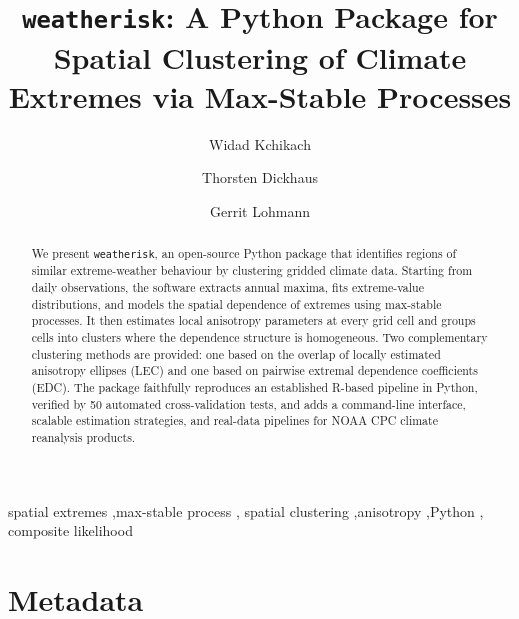 \documentclass[preprint,12pt,a4paper]{elsarticle}
\begin{document}
\begin{frontmatter}

\title{\texttt{weatherisk}: A Python Package for Spatial Clustering
  of Climate Extremes via Max-Stable Processes}

\author[awi,uni]{Widad Kchikach}

\author[uni]{Thorsten Dickhaus}
\author[awi,uni]{Gerrit Lohmann}

\address[awi]{Alfred Wegener Institute Helmholtz Centre for Polar
  and Marine Research, Bremerhaven, Germany}
\address[uni]{University of Bremen, Bremen, Germany}

\begin{abstract}
We present \texttt{weatherisk}, an open-source Python package that
identifies regions of similar extreme-weather behaviour by clustering
gridded climate data.  Starting from daily observations, the software
extracts annual maxima, fits extreme-value distributions, and models
the spatial dependence of extremes using max-stable processes.  It
then estimates local anisotropy parameters at every grid cell and
groups cells into clusters where the dependence structure is
homogeneous.  Two complementary clustering methods are provided:
one based on the overlap of locally estimated anisotropy ellipses
(LEC) and one based on pairwise extremal dependence coefficients
(EDC).  The package faithfully reproduces an established R-based
pipeline in Python, verified by 50 automated cross-validation tests,
and adds a command-line interface, scalable estimation strategies,
and real-data pipelines for NOAA CPC climate reanalysis products.
\end{abstract}

\begin{keyword}
spatial extremes \sep max-stable process \sep
spatial clustering \sep anisotropy \sep Python \sep
composite likelihood
\end{keyword}

\end{frontmatter}

\section*{Metadata}
\label{sec:metadata}
\end{document}
